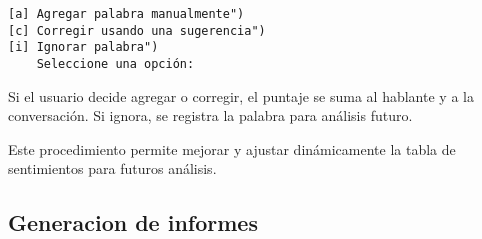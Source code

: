 \begin{verbatim}
[a] Agregar palabra manualmente")
[c] Corregir usando una sugerencia")
[i] Ignorar palabra")
    Seleccione una opción:
\end{verbatim}

Si el usuario decide agregar o corregir, el puntaje se suma al hablante y a la conversación. Si
ignora, se registra la palabra para análisis futuro.

Este procedimiento permite mejorar y ajustar dinámicamente la tabla de sentimientos para
futuros análisis.

\subsection{Generacion de informes}
